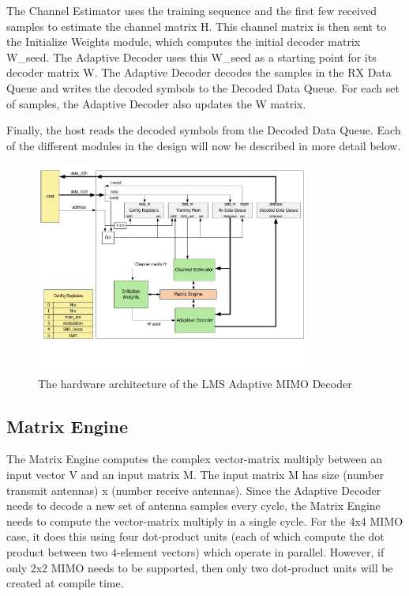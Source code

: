 \documentclass[journal]{IEEEtran}
\begin{document}
The Channel Estimator uses the training sequence and the first few received samples to estimate the channel matrix H. This channel matrix is then sent to the Initialize Weights module, which computes the initial decoder matrix W\_seed. The Adaptive Decoder uses this W\_seed as a starting point for its decoder matrix W. The Adaptive Decoder decodes the samples in the RX Data Queue and writes the decoded symbols to the Decoded Data Queue. For each set of samples, the Adaptive Decoder also updates the W matrix.

Finally, the host reads the decoded symbols from the Decoded Data Queue. Each of the different modules in the design will now be described in more detail below.

\begin{figure}[!h]
\centering
\includegraphics*[width=9cm, viewport = 0 90 789 600]{images/top_level_arch.pdf}
\caption{The hardware architecture of the LMS Adaptive MIMO Decoder}
\label{top_level_arch}
\end{figure}

\subsection{Matrix Engine}

The Matrix Engine computes the complex vector-matrix multiply between an input vector V and an input matrix M. The input matrix M has size (number transmit antennas) x (number receive antennas). Since the Adaptive Decoder needs to decode a new set of antenna samples every cycle, the Matrix Engine needs to compute the vector-matrix multiply in a single cycle. For the 4x4 MIMO case, it does this using four dot-product units (each of which compute the dot product between two 4-element vectors) which operate in parallel. However, if only 2x2 MIMO needs to be supported, then only two dot-product units will be created at compile time.
\end{document}
